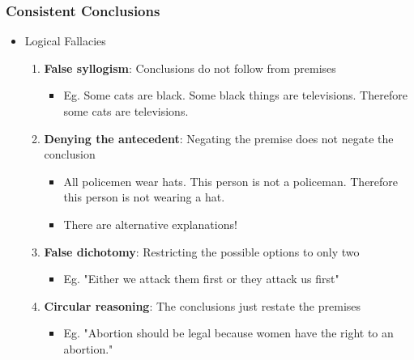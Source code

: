 \documentclass[xcolor=x11names,compress]{beamer}\usepackage[]{graphicx}\usepackage[]{xcolor}
\renewcommand{\(}{\begin{columns}}
\renewcommand{\)}{\end{columns}}
\newcommand{\<}[1]{\begin{column}{#1}}
\renewcommand{\>}{\end{column}}
\begin{document}
\begin{frame}
\frametitle{Consistent Conclusions}
\begin{itemize}
\item Logical Fallacies
\pause
\begin{enumerate}
\item \textbf{False syllogism}: Conclusions do not follow from premises
\begin{itemize}
\item Eg. Some cats are black. Some black things are televisions. Therefore some cats are televisions.
\pause
\end{itemize}
\item \textbf{Denying the antecedent}: Negating the premise does not negate the conclusion
\begin{itemize}
\item All policemen wear hats. This person is not a policeman. Therefore this person is not wearing a hat.
\item There are alternative explanations!
\end{itemize}
\item \textbf{False dichotomy}: Restricting the possible options to only two
\begin{itemize}
\item Eg. "Either we attack them first or they attack us first"
\pause
\end{itemize}
\item \textbf{Circular reasoning}: The conclusions just restate the premises
\begin{itemize}
\item Eg. "Abortion should be legal because women have the right to an abortion."
\end{itemize}
\end{enumerate}
\end{itemize}
\end{frame}
\end{document}
